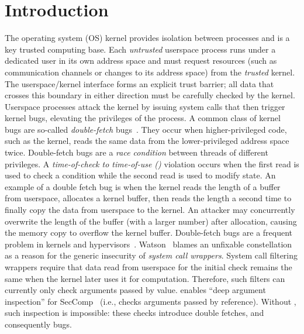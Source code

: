 \documentclass[letterpaper,twocolumn,10pt]{article}
\begin{document}
\section{Introduction}

The operating system (OS) kernel provides isolation between processes and is
a key trusted computing
base. Each \emph{untrusted} userspace process runs under a
dedicated user in its own address space and must request resources (such as
communication channels or changes to its address space) from the \emph{trusted}
kernel. The userspace/kernel interface forms an explicit trust barrier;
all data that crosses this boundary in either direction must be carefully
checked by the kernel.
%
Userspace processes attack the kernel by issuing system calls that then trigger
kernel bugs, elevating the privileges of the process.
%
A common class of kernel bugs are so-called \emph{double-fetch}
bugs~\cite{serna08doublefetch, twizsgrakky07ring0, wilhelm2016xenpwn,
wang2018survey}. They occur when higher-privileged code, such as
the kernel, reads the same data from the lower-privileged address space twice.
%
Double-fetch bugs are a
\emph{race condition} between threads of different privileges. A
\emph{time-of-check to time-of-use (\tocttou)} violation occurs when the first
read is used to check a condition while the second read is used to modify
state.
%
An example of a double fetch bug is when the kernel reads the length of a buffer
from userspace, allocates a kernel buffer, then reads the length a second time
to finally copy the data from userspace to the kernel. An attacker may concurrently
overwrite the length of the buffer (with a larger number) after allocation,
causing the memory copy to overflow the kernel buffer.
%
Double-fetch bugs are a frequent problem in kernels and
hypervisors~\cite{cve201812633, cve202012652, cve20131332, cve201920610,
cve20158550, cve201610439, cve201610435, cve201610433, cve20195519,
cve20168438}.
Watson~\cite{watson2007exploiting} blames an unfixable \tocttou
constellation as a reason for the generic insecurity of \emph{system call
wrappers}.
System call filtering wrappers require that data read from userspace for the
initial check remains the same when the kernel later uses it for computation.
Therefore, such filters can currently only check arguments passed by value.
\midas enables ``deep argument inspection'' for SecComp~\cite{seccomp_deep, seccomp}
(i.e., checks arguments passed by reference).
Without \midas, such inspection is impossible: these checks
introduce double fetches, and consequently \tocttou bugs.
\end{document}
